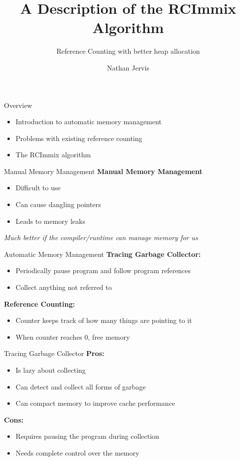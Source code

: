 \documentclass{beamer}
\title[RCImmix]{A Description of the RCImmix Algorithm}
\subtitle[RC]{Reference Counting with better heap allocation}
\author[N. Jervis]{Nathan Jervis}
\institute[McMaster]{
  Department of Computer Science\\
  McMaster University, Hamilton\\
  \texttt{jervisnd@mcmaster.ca}\\
  \texttt{1211159}
}
\begin{document}
\begin{frame}[plain]
  \titlepage
\end{frame}

\begin{frame}{Overview}
	\begin{itemize}
		\item Introduction to automatic memory management
		\item Problems with existing reference counting
		\item The RCImmix algorithm
	\end{itemize}
\end{frame}

\begin{frame}{Manual Memory Management}
	\textbf{Manual Memory Management}
	\begin{itemize}
		\item Difficult to use
		\item Can cause dangling pointers
		\item Leads to memory leaks
	\end{itemize}
	\emph{Much better if the compiler/runtime can manage memory for us}
\end{frame}

\begin{frame}{Automatic Memory Management}
	\textbf{Tracing Garbage Collector:}
	\begin{itemize}
		\item Periodically pause program and follow program references
		\item Collect anything not referred to
	\end{itemize}
	\textbf{Reference Counting:}
	\begin{itemize}
		\item Counter keeps track of how many things are pointing to it
		\item When counter reaches 0, free memory
	\end{itemize}
\end{frame}

\begin{frame}{Tracing Garbage Collector}
	\textbf{Pros:}
	\begin{itemize}
		\item Is lazy about collecting
		\item Can detect and collect all forms of garbage
		\item Can compact memory to improve cache performance
	\end{itemize}
	\textbf{Cons:}
	\begin{itemize}
		\item Requires pausing the program during collection
		\item Needs complete control over the memory
	\end{itemize}
\end{frame}
\end{document}
